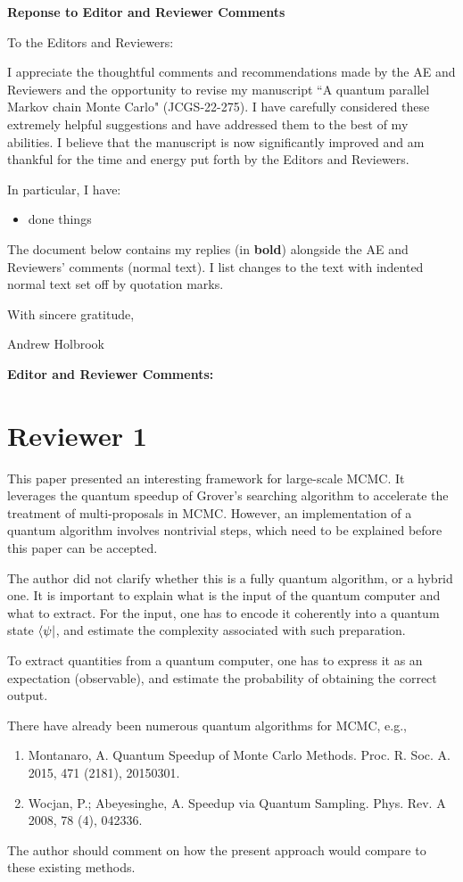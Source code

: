 \documentclass[12pt]{article}
\def\paperTitle{A quantum parallel Markov chain Monte Carlo}
\def\paperID{JCGS-22-275}
\begin{document}
%

\centerline{\large \bf Reponse to Editor and Reviewer Comments}

To the Editors and Reviewers:

I appreciate the thoughtful comments and recommendations made by the AE and Reviewers and the opportunity to revise my manuscript ``\paperTitle" (\paperID).
I have carefully considered these extremely helpful suggestions and have addressed them to the best of my abilities.  I believe that the manuscript is now significantly improved and am thankful for the time and energy put forth by the Editors and Reviewers.

In particular, I have:
\begin{itemize}
	\item done things
\end{itemize}


The document below contains my replies (in \textbf{bold}) alongside the AE and Reviewers' comments (normal text).  I list changes to the text with indented normal text set off by quotation marks.

With sincere gratitude,

Andrew Holbrook
\clearpage


{\Large \bf Editor and Reviewer Comments:}


\section*{Reviewer 1}


This paper presented an interesting framework for large-scale MCMC. It leverages the quantum speedup of Grover's searching algorithm to accelerate the treatment of multi-proposals in MCMC. However, an implementation of a quantum algorithm involves nontrivial steps, which need to be explained before this paper can be accepted.

The author did not clarify whether this is a fully quantum algorithm, or a hybrid one. It is important to explain what is the input of the quantum computer and what to extract. For the input, one has to encode it coherently into a quantum state $\bra{\psi}$, and estimate the complexity associated with such preparation.

To extract quantities from a quantum computer, one has to express it as an expectation (observable), and estimate the probability of obtaining the correct output. 

There have already been numerous quantum algorithms for MCMC, e.g.,
\begin{enumerate}
	\item Montanaro, A. Quantum Speedup of Monte Carlo Methods. Proc. R. Soc. A. 2015, 471 (2181), 20150301. \citep{montanaro}
	
	\item Wocjan, P.; Abeyesinghe, A. Speedup via Quantum Sampling. Phys. Rev. A 2008, 78 (4), 042336. \citep{wocjan2008speedup}
\end{enumerate}
The author should comment on how the present approach would compare to these existing methods.
\end{document}
